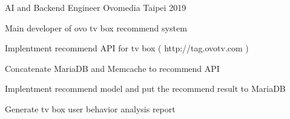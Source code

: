 

\begin{cventries}

  \cventry
    {AI and Backend Engineer} %
    {Ovomedia} %
    {Taipei} %
    {2019} %
    {
      \begin{cvitems} %
        \item {Main developer of ovo tv box recommend system}
        \item {Implentment recommend API for tv box ( http://tag.ovotv.com )}
        \item {Concatenate MariaDB and Memcache to recommend API}
        \item {Implentment recommend model and put the recommend result to MariaDB}
        \item {Generate tv box user behavior analysis report}
      \end{cvitems}
    }

\end{cventries}

